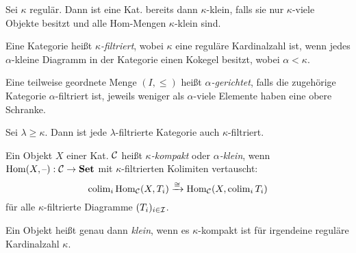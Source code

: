 \documentclass{cheat-sheet}
\begin{document}
\begin{bem}
  Sei $\kappa$ regulär. Dann ist eine Kat. bereits dann $\kappa$-klein, falls sie nur $\kappa$-viele Objekte besitzt und alle Hom-Mengen $\kappa$-klein sind.
\end{bem}

\begin{defn}
  Eine Kategorie heißt \emph{$\kappa$-filtriert}, wobei $\kappa$ eine reguläre Kardinalzahl ist, wenn jedes $\alpha$-kleine Diagramm in der Kategorie einen Kokegel besitzt, wobei $\alpha < \kappa$.
\end{defn}

\begin{defn}
  Eine teilweise geordnete Menge $(I, \leq)$ heißt \emph{$\alpha$-gerichtet}, falls die zugehörige Kategorie $\alpha$-filtriert ist, \dh{} jeweils weniger als $\alpha$-viele Elemente haben eine obere Schranke.
\end{defn}

\begin{bem}
  Sei $\lambda \geq \kappa$. Dann ist jede $\lambda$-filtrierte Kategorie auch $\kappa$-filtriert.
\end{bem}

\begin{defn}
  Ein Objekt $X$ einer Kat. $\mathcal{C}$ heißt \emph{$\kappa$-kompakt} oder \emph{$\alpha$-klein}, wenn $\operatorname{Hom}(X, \text{--}) : \mathcal{C} \to \mathbf{Set}$ mit $\kappa$-filtrierten Kolimiten vertauscht:
  \[
    \operatorname{colim}_i \operatorname{Hom}_{\mathcal{C}}(X, T_i) \xrightarrow{\cong} \operatorname{Hom}_{\mathcal{C}}(X, \operatorname{colim}_i T_i)
  \]
  für alle $\kappa$-filtrierte Diagramme $(T_i)_{i \in \mathcal{I}}$.
\end{defn}

\begin{defn}
  Ein Objekt heißt genau dann \emph{klein}, wenn es $\kappa$-kompakt ist für irgendeine reguläre Kardinalzahl $\kappa$.
\end{defn}

\iffalse
\begin{idee}
  Sei $X$ eine endliche Menge. Sei $X \subset \cup_{i \in \N} T_i$, $T_i \subseteq T_{i+1}$. Dann liegt $X$ schon vollständig in einem der $T_i$.
\end{idee}
\fi
\end{document}
